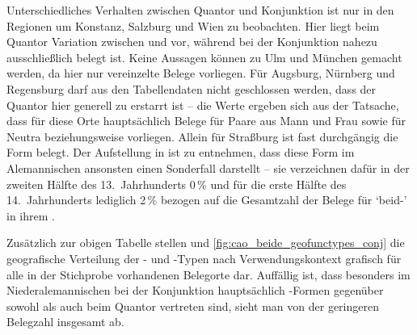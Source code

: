 Unterschiedliches Verhalten zwischen Quantor und Konjunktion ist nur in den
Regionen um Konstanz, Salzburg und Wien zu beobachten. Hier liegt beim Quantor
Variation zwischen  und  vor, während bei der
Konjunktion nahezu ausschließlich  belegt ist. Keine Aussagen
können zu Ulm und München gemacht werden, da hier nur vereinzelte Belege
vorliegen. Für Augsburg, Nürnberg und Regensburg darf aus den Tabellendaten
nicht geschlossen werden, dass der Quantor hier generell zu 
erstarrt ist -- die Werte ergeben sich aus der Tatsache, dass für diese Orte
hauptsächlich Belege für Paare aus Mann und Frau sowie für Neutra
beziehungsweise  vorliegen. Allein für Straßburg ist fast
durchgängig die Form  belegt. Der Aufstellung in \citet[621,
Abbildung P~177]{ksw2} ist zu entnehmen, dass diese Form im
Alemannischen ansonsten einen Sonderfall darstellt -- sie
verzeichnen dafür in der zweiten Hälfte des 13.~Jahrhunderts 0\,\% und für die
erste Hälfte des 14.~Jahrhunderts lediglich 2\,\% bezogen auf die Gesamtzahl
der Belege für  `beid-' in ihrem .

Zusätzlich zur obigen Tabelle stellen 
und \ref{fig:cao_beide_geofunctypes_conj} die geografische
Verteilung der - und
-Typen nach Verwendungskontext grafisch für alle in der Stichprobe
vorhandenen Belegorte dar. Auffällig ist, dass besonders im
Nieder\-alemannischen bei der Konjunktion hauptsächlich
-Formen gegenüber sowohl  als auch  beim
Quantor vertreten sind, sieht man von der geringeren Belegzahl insgesamt ab.

